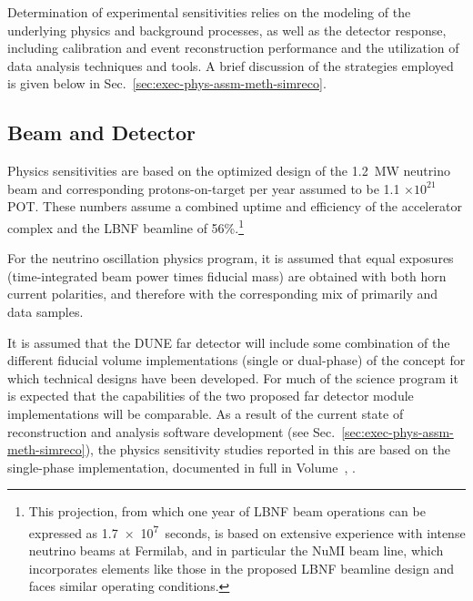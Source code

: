 Determination of experimental sensitivities relies on the
modeling of the underlying physics and background processes,
as well as the detector response, including calibration and
event reconstruction performance and the utilization of data
analysis techniques and tools.
A brief discussion of the strategies employed is given below
in Sec.~\ref{sec:exec-phys-assm-meth-simreco}. 

\subsection{Beam and Detector}
\label{sec:exec-phys-assm-meth-beamdetector}

Physics sensitivities are based on 
the optimized design of the 1.2~MW neutrino beam and
corresponding protons-on-target per year assumed to
be 1.1 $\times 10^{21}$ POT.  These numbers assume a combined
uptime and efficiency of the \fnal accelerator complex and the
LBNF beamline of 56\%.\footnote{This projection, from which one  
year of LBNF beam operations can be expressed as \SI{1.7e7}{seconds}, 
is based on extensive 
experience with intense neutrino beams at Fermilab, and in particular 
the NuMI beam line, which incorporates elements like those in the  
proposed LBNF beamline design and faces similar operating conditions.} 

For the neutrino oscillation physics program, it is assumed that
equal exposures (time-integrated beam power times fiducial mass) are obtained with both horn current polarities,
and therefore with the corresponding mix of primarily \numu
and \anumu data samples.

It is assumed that the DUNE far detector will include some
combination of the different \nominalmodsize fiducial volume
implementations (single or dual-phase) of the \lartpc concept
for which technical designs have been developed.
For much of the science program it is expected that the
capabilities of the two proposed far detector module 
implementations will be comparable.  As a result of the
current state of reconstruction and analysis software development
(see Sec.~\ref{sec:exec-phys-assm-meth-simreco}), the
physics sensitivity studies reported in this  are based on
the single-phase \lartpc implementation,
documented in full in Volume~\volnumbersp{}, \voltitlesp{}.

